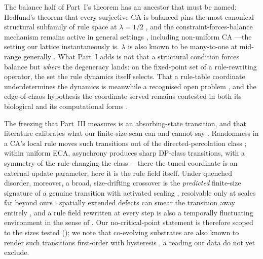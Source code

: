 \documentclass[man,12pt,floatsintext,donotrepeattitle]{apa7}
\newcommand{\secref}[1]{\emph{\nameref{#1}}}
\begin{document}
The balance half of Part~I's theorem has an ancestor that must be named:
Hedlund's theorem that every surjective CA is balanced pins the most
canonical structural subfamily of rule space at $\lambda = 1/2$
\parencite{hedlund1969endomorphisms}, and the constraint-forces-balance
mechanism remains active in general settings \parencite{capobianco2017postsurjectivity},
including non-uniform CA \parencite{paturi2025reversibility}---the setting our
lattice instantaneously is. $\lambda$ is also known to be many-to-one at
mid-range generally \parencite{sakai2002lambdaF}. What Part~I adds is not
that a structural condition forces balance but \emph{where} the degeneracy
lands: on the fixed-point set of a rule-rewriting operator, the set the rule
dynamics itself selects. That a rule-table coordinate underdetermines the
dynamics is meanwhile a recognised open problem
\parencite{vispoel2022classification}, and the edge-of-chaos hypothesis the
coordinate served remains contested in both its biological and its
computational forms
\parencite{teuscher2022revisiting,roli2018criticality,carroll2020reservoir,park2023farfrom}.

The freezing that Part~III measures is an absorbing-state transition, and
that literature calibrates what our finite-size scan can and cannot say
\parencite{hinrichsen2000nonequilibrium}. Randomness in a CA's local rule
moves such transitions out of the directed-percolation class
\parencite{noest1986new}; within uniform ECA, asynchrony produces sharp
DP-class transitions, with a symmetry of the rule changing the class
\parencite{fates2009asynchronism}---there the tuned coordinate is an external
update parameter, here it is the rule field itself. Under quenched
disorder, moreover, a broad, size-drifting crossover is the \emph{predicted}
finite-size signature of a genuine transition with activated scaling
\parencite{hooyberghs2004absorbing,vojta2006rare}, resolvable only at scales
far beyond ours \parencite{vojta2009infinite}; spatially extended defects
can smear the transition away entirely \parencite{vojta2004broadening}, and
a rule field rewritten at every step is also a temporally fluctuating
environment in the sense of \textcite{vazquez2011temporal}. Our
no-critical-point statement is therefore scoped to the sizes tested
(\secref{sec:limits}); we note that co-evolving substrates are also known to
render such transitions first-order with hysteresis
\parencite{gross2006epidemic}, a reading our data do not yet exclude.
\end{document}
